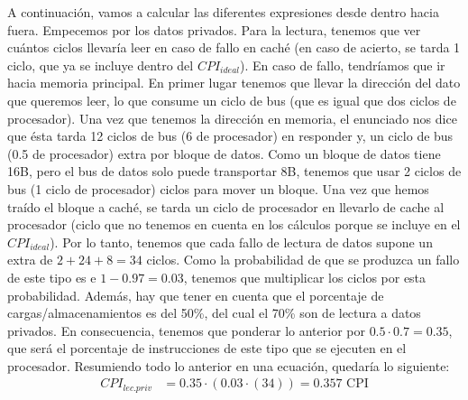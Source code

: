 \documentclass[12pt,a4paper]{article}
\begin{document}
A continuación, vamos a calcular las diferentes expresiones desde dentro hacia fuera. Empecemos por los datos privados. Para la lectura, tenemos que ver cuántos ciclos llevaría leer en caso de fallo en caché (en caso de acierto, se tarda 1 ciclo, que ya se incluye dentro del $CPI_{ideal}$). En caso de fallo, tendríamos que ir hacia memoria principal. En primer lugar tenemos que llevar la dirección del dato que queremos leer, lo que consume un ciclo de bus (que es igual que dos ciclos de procesador). Una vez que tenemos la dirección en memoria, el enunciado nos dice que ésta tarda 12 ciclos de bus (6 de procesador) en responder y, un ciclo de bus (0.5 de procesador) extra por bloque de datos. Como un bloque de datos tiene 16B, pero el bus de datos solo puede transportar 8B, tenemos que usar 2 ciclos de bus (1 ciclo de procesador) ciclos para mover un bloque. Una vez que hemos traído el bloque a caché, se tarda un ciclo de procesador en llevarlo de cache al procesador (ciclo que no tenemos en cuenta en los cálculos porque se incluye en el $CPI_{ideal}$). Por lo tanto, tenemos que cada fallo de lectura de datos supone un extra de $2+24+8=34$ ciclos. Como la probabilidad de que se produzca un fallo de este tipo es e $1-0.97=0.03$, tenemos que multiplicar los ciclos por esta probabilidad. Además, hay que tener en cuenta que el porcentaje de cargas/almacenamientos es del 50\%, del cual el 70\% son de lectura a datos privados. En consecuencia, tenemos que ponderar lo anterior por $0.5\cdot 0.7=0.35$, que será el porcentaje de instrucciones de este tipo que se ejecuten en el procesador. Resumiendo todo lo anterior en una ecuación, quedaría lo siguiente:
\begin{align*}
CPI_{lec.priv}&=0.35\cdot (0.03\cdot (34))=0.357\text{ CPI}
\end{align*}
\end{document}
